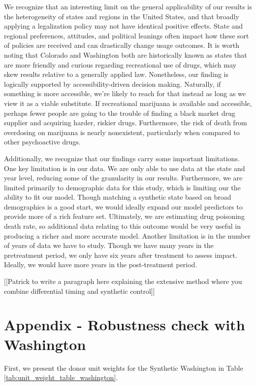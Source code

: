 \documentclass{article}
\begin{document}
We recognize that an interesting limit on the general applicability of our results is the heterogeneity of states and regions in the United States, and that broadly applying a legalization policy may not have identical positive effects. State and regional preferences, attitudes, and political leanings often impact how these sort of policies are received and can drastically change usage outcomes. It is worth noting that Colorado and Washington both are historically known as states that are more friendly and curious regarding recreational use of drugs, which may skew results relative to a generally applied law. Nonetheless, our finding is logically supported by accessibility-driven decision making. Naturally, if something is more accessible, we're likely to reach for that instead as long as we view it as a viable substitute. If recreational marijuana is available and accessible, perhaps fewer people are going to the trouble of finding a black market drug supplier and acquiring harder, riskier drugs. Furthermore, the risk of death from overdosing on marijuana is nearly nonexistent, particularly when compared to other psychoactive drugs.

Additionally, we recognize that our findings carry some important limitations. One key limitation is in our data. We are only able to use data at the state and year level, reducing some of the granularity in our results. Furthermore, we are limited primarily to demographic data for this study, which  is limiting our the ability to fit our model. Though matching a synthetic state based on broad demographics is a good start, we would ideally expand our model predictors to provide more of a rich feature set. Ultimately, we are estimating drug poisoning death rate, so additional data relating to this outcome would be very useful in producing a richer and more accurate model. Another limitation is in the number of years of data we have to study. Though we have many years in the pretreatment period, we only have six years after treatment to assess impact. Ideally, we would have more years in the post-treatment period.

[[Patrick to write a paragraph here explaining the extensive method where you combine differential timing and synthetic control]]

\section{Appendix - Robustness check with Washington}

First, we present the donor unit weights for the Synthetic Washington in Table \ref{tab:unit_weight_table_washington}.
\end{document}
